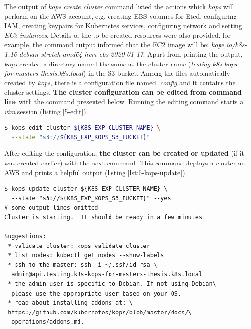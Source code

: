 The output of \textit{kops create cluster} command listed the actions which \textit{kops} will perform on the AWS account, e.g. creating EBS volumes for Etcd, configuring IAM, creating keypairs for Kubernetes services, configuring network and setting \textit{EC2 instances}. Details of the to-be-created resources were also provided, for example, the command output informed that the EC2 image will be: \textit{kope.io/k8s-1.16-debian-stretch-amd64-hvm-ebs-2020-01-17}. Apart from printing the output, \textit{kops} created a directory named the same as the cluster name (\textit{testing.k8s-kops-for-masters-thesis.k8s.local}) in the S3 bucket. Among the files automatically created by \textit{kops}, there is a configuration file named: \textit{config} and it contains the cluster settings. \textbf{The cluster configuration can be edited from command line} with the command presented below. Running the editing command starts a \textit{vim} session (listing \ref{5-edit}).
\begin{lstlisting}[basicstyle=\scriptsize,xleftmargin=0cm,label=5-edit,caption={Command used to edit a Kubernetes cluster managed by \textit{kops}},captionpos=b,language=Bash]
$ kops edit cluster ${K8S_EXP_CLUSTER_NAME} \
  --state "s3://${K8S_EXP_KOPS_S3_BUCKET}"
\end{lstlisting}
After editing the configuration, \textbf{the cluster can be created or updated} (if it was created earlier) with the next command. This command deploys a cluster on AWS and prints a helpful output (listing \ref{lst:5-kops-update}).
\begin{mdframed}[linecolor=white]
\begin{lstlisting}[basicstyle=\scriptsize,xleftmargin=-0.5cm,caption={Command used to deploy a Kubernetes cluster with \textit{kops}},label=lst:5-kops-update]
$ kops update cluster ${K8S_EXP_CLUSTER_NAME} \
  --state "s3://${K8S_EXP_KOPS_S3_BUCKET}" --yes
# some output lines omitted
Cluster is starting.  It should be ready in a few minutes.

Suggestions:
 * validate cluster: kops validate cluster
 * list nodes: kubectl get nodes --show-labels
 * ssh to the master: ssh -i ~/.ssh/id_rsa \
  admin@api.testing.k8s-kops-for-masters-thesis.k8s.local
 * the admin user is specific to Debian. If not using Debian\
  please use the appropriate user based on your OS.
 * read about installing addons at: \
 https://github.com/kubernetes/kops/blob/master/docs/\
  operations/addons.md.
\end{lstlisting}
\end{mdframed}

